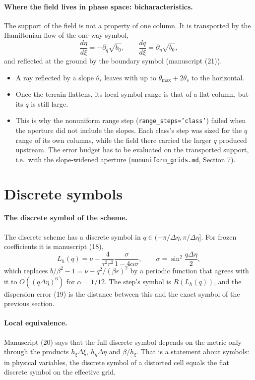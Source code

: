 \documentclass[11pt]{article}
\newcommand{\het}{\nu}
\newcommand{\pd}{\partial}
\begin{document}
\paragraph{Where the field lives in phase space: bicharacteristics.} The
support of the field is not a property of one column. It is transported by the
Hamiltonian flow of the one-way symbol,
\begin{equation}\label{eq:rays}
\frac{d\eta}{d\xi}=-\pd_q\sqrt{b_0},\qquad \frac{dq}{d\xi}=\pd_\eta\sqrt{b_0},
\end{equation}
and reflected at the ground by the boundary symbol (manuscript (21)).
\begin{itemize}
\item A ray reflected by a slope $\theta_s$ leaves with up to
  $\theta_{\max}+2\theta_s$ to the horizontal.
\item Once the terrain flattens, its local symbol range is that of a flat
  column, but its $q$ is still large.
\item This is why the nonuniform range step (\texttt{range\_steps='class'})
  failed when the aperture did not include the slopes. Each class's step was
  sized for the $q$ range of its own columns, while the field there carried
  the larger $q$ produced upstream. The error budget has to be evaluated on
  the transported support, i.e.\ with the slope-widened aperture
  (\texttt{nonuniform\_grids.md}, Section 7).
\end{itemize}

\section{Discrete symbols}

\paragraph{The discrete symbol of the scheme.} The discrete scheme has a
discrete symbol in $q\in(-\pi/\Delta\eta,\pi/\Delta\eta]$. For frozen
coefficients it is manuscript (18),
\[
L_h(q)=\het-\frac4{\tau^2r^2}\frac{\sigma}{1-4\alpha\sigma},\qquad \sigma=\sin^2\frac{q\Delta\eta}2,
\]
which replaces $b/\beta^2-1=\het-q^2/(\beta r)^2$ by a periodic function that
agrees with it to $O((q\Delta\eta)^6)$ for $\alpha=1/12$. The step's symbol is
$R(L_h(q))$, and the dispersion error (19) is the distance between this and the
exact symbol of the previous section.

\paragraph{Local equivalence.} Manuscript (20) says that the full discrete
symbol depends on the metric only through the products $h_\xi\Delta\xi$,
$h_\eta\Delta\eta$ and $\beta/h_\xi$. That is a statement about symbols: in
physical variables, the discrete symbol of a distorted cell equals the flat
discrete symbol on the effective grid.
\end{document}
